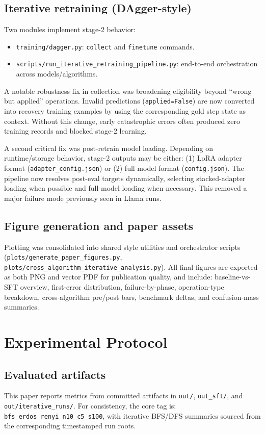 \documentclass[sigplan,screen]{acmart}
\begin{document}
\subsection{Iterative retraining (DAgger-style)}
Two modules implement stage-2 behavior:
\begin{itemize}
  \item \texttt{training/dagger.py}: \texttt{collect} and \texttt{finetune} commands.
  \item \texttt{scripts/run\_iterative\_retraining\_pipeline.py}: end-to-end orchestration across models/algorithms.
\end{itemize}

A notable robustness fix in collection was broadening eligibility beyond ``wrong but applied'' operations.
Invalid predictions (\texttt{applied=False}) are now converted into recovery training examples by using the corresponding gold step state as context.
Without this change, early catastrophic errors often produced zero training records and blocked stage-2 learning.

A second critical fix was post-retrain model loading.
Depending on runtime/storage behavior, stage-2 outputs may be either:
(1) LoRA adapter format (\texttt{adapter\_config.json}) or (2) full model format (\texttt{config.json}).
The pipeline now resolves post-eval targets dynamically, selecting stacked-adapter loading when possible and full-model loading when necessary.
This removed a major failure mode previously seen in Llama runs.

\subsection{Figure generation and paper assets}
Plotting was consolidated into shared style utilities and orchestrator scripts (\texttt{plots/generate\_paper\_figures.py}, \texttt{plots/cross\_algorithm\_iterative\_analysis.py}).
All final figures are exported as both PNG and vector PDF for publication quality, and include:
baseline-vs-SFT overview, first-error distribution, failure-by-phase, operation-type breakdown, cross-algorithm pre/post bars, benchmark deltas, and confusion-mass summaries.

\section{Experimental Protocol}
\subsection{Evaluated artifacts}
This paper reports metrics from committed artifacts in \texttt{out/}, \texttt{out\_sft/}, and \texttt{out/iterative\_runs/}.
For consistency, the core tag is:
\texttt{bfs\_erdos\_renyi\_n10\_c5\_s100}, with iterative BFS/DFS summaries sourced from the corresponding timestamped run roots.
\end{document}

